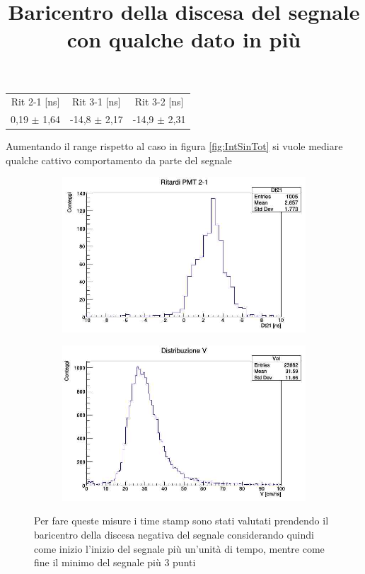 \documentclass[a4paper]{article}
\begin{document}
\begin{tabular}{c|c|c}
Rit 2-1 [ns] & Rit 3-1 [ns] & Rit 3-2 [ns] \\
\hfill
0,19 $\pm$ 1,64 & -14,8 $\pm$ 2,17 & -14,9 $\pm$ 2,31
\hfill
\label{tab:RitLargo}
\end{tabular}

Aumentando il range rispetto al caso in figura \ref{fig:IntSinTot} si vuole mediare qualche cattivo comportamento da parte del segnale

\begin{figure}[H]
     \centering
     \title{Baricentro della discesa del segnale con qualche dato in più}
     \begin{center}
     \begin{subfigure}[b]{0.4\textwidth}
         \centering
         \includegraphics[width=\textwidth]{./immagini/TimeOfFlight/Rit21Fore.jpg}
         \caption{}
         \label{fig:Dt21ForeA}
     \end{subfigure}
     \hfill
     \begin{subfigure}[b]{0.4\textwidth}
         \centering
         \includegraphics[width=\textwidth]{./immagini/TimeOfFlight/VFore.jpg}
         \caption{}
         \label{fig:VForeA}
     \end{subfigure}
     \end{center}
     \caption{Per fare queste misure i time stamp sono stati valutati prendendo il baricentro della discesa negativa del segnale considerando quindi come inizio l'inizio del segnale più un'unità di tempo, mentre come fine il minimo del segnale più 3 punti}        
     \label{fig:ForeA}
\end{figure}
\end{document}
